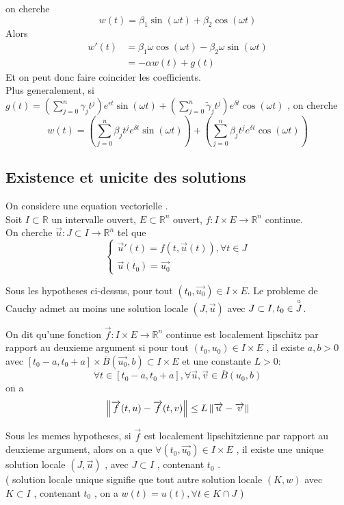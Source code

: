 \documentclass[../main.tex]{subfiles}
\begin{document}
on cherche
\[ 
	w( t) = \beta_1 \sin ( \omega t) + \beta_2 \cos ( \omega t) 
\]
Alors
\begin{align*}
	w'( t)  &= \beta_1 \omega \cos ( \omega t) - \beta_2 \omega \sin ( \omega t) \\
		&= - \alpha w( t)  + g( t) 
\end{align*}
Et on peut donc faire coincider les coefficients.\\
Plus generalement, si $g( t) = \left( \sum_{j=0}^{ n}\gamma_j t^{j} \right) e^{\epsilon t} \sin ( \omega t) + \left( \sum_{j=0}^{ n}\tilde \gamma_j t^{j}\right) e^{\delta t} \cos ( \omega t) $ , on cherche
\[ 
	w( t) = \left( \sum_{j=0}^{ n} \beta_j t^{j} e^{\delta t} \sin ( \omega t )  \right) + \left( \sum_{j=0}^{ n} \beta_j t^{j} e^{\delta t} \cos ( \omega t )  \right)
\]
\subsection{Existence et unicite des solutions}
On considere une equation vectorielle .\\
Soit $I \subset  \mathbb{R}$ un intervalle ouvert, $E \subset  \mathbb{R}^n$ ouvert, $f : I \times E \to \mathbb{R}^n$ continue.\\
On cherche $\vec{u}: J \subset I \to \mathbb{R}^n$ tel que 
\[ 
	\begin{cases}
	\vec{u}'( t) = f( t,\vec{u}( t) ) , \forall t \in J\\
	\vec{u}( t_0) = \vec{u_0}
	\end{cases}
\]
\begin{thm}
	Sous les hypotheses ci-dessus, pour tout $( t_0, \vec{u_0}) \in I \times E$. Le probleme de Cauchy admet au moins une solution locale $( J, \vec{u}) $ avec $J \subset I, t_0 \in \overset{\circ}{J}$.
\end{thm}
\begin{defn}
	On dit qu'une fonction $\vec{f}: I \times E \to \mathbb{R}^n$ continue est localement lipschitz par rapport au deuxieme argument si pour tout $ ( t_0, u_0) \in I \times E$ , il existe $a,b >0$ avec $ [ t_0-a, t_0+a] \times \overline{B}( \vec{u_0}, b) \subset I \times E$ et une constante $L>0:$ 
	\[ 
		\forall t \in [ t_0-a, t_0+a] , \forall \vec{u},\vec{v} \in \overline{B}( u_0,b) 
	\]
	on a 
	\[ 
		\left\lVert  \overrightarrow{f}( t,u) - \overrightarrow{f}( t,v)  \right\rVert \leq L \left\lVert \overrightarrow{u} - \overrightarrow{v}\right\rVert 	
	\]

	
\end{defn}
\begin{thm}
	Sous les memes hypotheses, si $\vec{f}$ est localement lipschitzienne par rapport au deuxieme argument, alors on a que $\forall ( t_0, \vec{u_0}) \in I \times E$ , il existe une unique solution locale $ ( J, \vec{u}) $ , avec $J \subset I$ , contenant $t_0$ .\\
	( solution locale unique signifie que tout autre solution locale $( K, w) $ avec $K \subset I$ , contenant $t_0$ , on a $ w( t) = u( t) ,\forall t \in K \cap J $   )
\end{thm}
\end{document}

